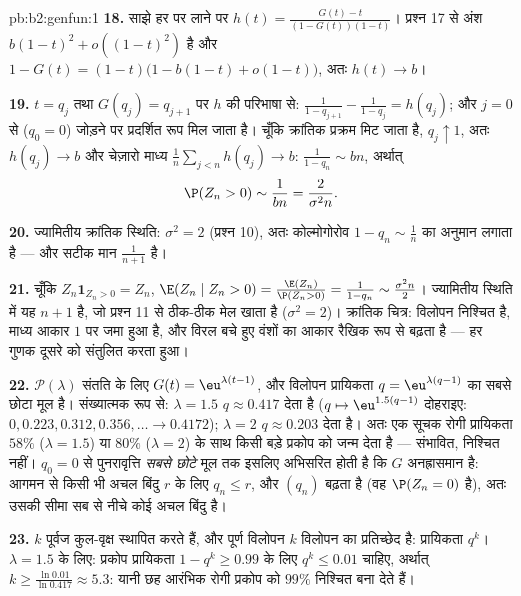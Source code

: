\begin{solution}{pb:b2:genfun:1}
\textbf{18.} साझे हर पर लाने पर $h(t) =
\frac{G(t) - t}{(1 - G(t))(1 - t)}$। प्रश्न 17 से अंश $b(1-t)^2 + o((1-t)^2)$ है और
$1 - G(t) = (1 -
t)\bigl(1 - b(1-t) + o(1-t)\bigr)$, अतः $h(t) \to b$।

\textbf{19.} $t = q_j$ तथा $G(q_j) =
q_{j+1}$ पर $h$ की परिभाषा से: $\frac1{1 - q_{j+1}} - \frac1{1-q_j} = h(q_j)$; और $j = 0$ से
($q_0 = 0$) जोड़ने पर प्रदर्शित रूप मिल जाता है। चूँकि क्रांतिक प्रक्रम
मिट जाता है, $q_j \uparrow 1$, अतः $h(q_j) \to
b$ और चेज़ारो माध्य $\frac1n\sum_{j<n}h(q_j) \to b$: $\frac1{1-q_n} \sim bn$, अर्थात्
\[
\P(Z_n > 0) \sim \frac1{bn} = \frac{2}{\sigma^2 n} .
\]

\textbf{20.} ज्यामितीय क्रांतिक स्थिति: $\sigma^2 = 2$ (प्रश्न 10), अतः
कोल्मोगोरोव $1 - q_n \sim \frac1n$ का अनुमान लगाता है --- और सटीक मान $\frac1{n+1}$ है।

\textbf{21.} चूँकि $Z_n\mathbf 1_{Z_n > 0} = Z_n$, $\E(Z_n
\mid Z_n > 0) = \frac{\E(Z_n)}{\P(Z_n > 0)} = \frac1{1 -
q_n} \sim \frac{\sigma^2n}2$। ज्यामितीय स्थिति में यह $n + 1$ है, जो
प्रश्न 11 से ठीक-ठीक मेल खाता है ($\sigma^2 = 2$)। क्रांतिक चित्र: विलोपन
निश्चित है, माध्य आकार $1$ पर जमा हुआ है, और विरल बचे हुए वंशों का
आकार रैखिक रूप से बढ़ता है --- हर गुणक दूसरे को संतुलित करता हुआ।

\textbf{22.} $\mathcal P(\lambda)$ संतति के लिए $G(t) =
\eu^{\lambda(t-1)}$, और विलोपन प्रायिकता $q = \eu^{\lambda(q-1)}$ का सबसे
छोटा मूल है। संख्यात्मक रूप से: $\lambda = 1.5$ $q \approx 0.417$ देता है ($q \mapsto
\eu^{1.5(q-1)}$ दोहराइए:
$0, 0.223, 0.312, 0.356, \dots \to 0.4172$); $\lambda = 2$ $q \approx 0.203$ देता है। अतः एक सूचक रोगी प्रायिकता $58\%$ ($\lambda = 1.5$) या
$80\%$ ($\lambda = 2$) के साथ किसी बड़े प्रकोप को जन्म देता है --- संभावित,
निश्चित नहीं। $q_0 = 0$ से पुनरावृत्ति \emph{सबसे छोटे} मूल तक इसलिए
अभिसरित होती है कि $G$ अनह्रासमान है: आगमन से किसी भी अचल बिंदु
$r$ के लिए $q_n \leq r$, और $(q_n)$ बढ़ता है (वह $\P(Z_n = 0)$ है), अतः उसकी सीमा सब
से नीचे कोई अचल बिंदु है।

\textbf{23.} $k$ पूर्वज  कुल-वृक्ष स्थापित करते हैं, और
पूर्ण विलोपन $k$  विलोपन  का प्रतिच्छेद है:
प्रायिकता $q^k$। $\lambda = 1.5$ के लिए: प्रकोप प्रायिकता $1 - q^k \geq 0.99$ के लिए $q^k \leq 0.01$ चाहिए,
अर्थात् $k \geq
\frac{\ln 0.01}{\ln 0.417} \approx 5.3$: यानी छह आरंभिक रोगी प्रकोप को $99\%$ निश्चित बना देते
हैं।


\end{solution}

